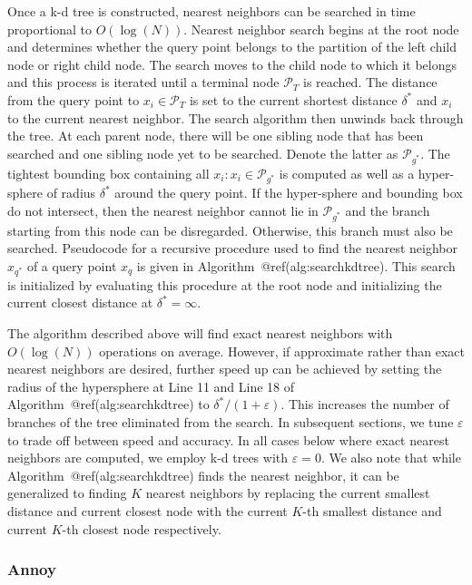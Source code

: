 \documentclass{article}
\begin{document}
Once a k-d tree is constructed, nearest neighbors can be searched in
time proportional to \(O(\log(N))\). Nearest neighbor search begins at
the root node and determines whether the query point belongs to the
partition of the left child node or right child node. The search moves
to the child node to which it belongs and this process is iterated until
a terminal node \(\mathcal{P}_T\) is reached. The distance from the
query point to \(x_i\in\mathcal{P}_T\) is set to the current shortest
distance \(\delta^*\) and \(x_i\) to the current nearest neighbor. The
search algorithm then unwinds back through the tree. At each parent
node, there will be one sibling node that has been searched and one
sibling node yet to be searched. Denote the latter as
\(\mathcal{P}_{g^*}\). The tightest bounding box containing all
\(x_i:x_i\in\mathcal{P}_{g^*}\) is computed as well as a hyper-sphere of
radius \(\delta^*\) around the query point. If the hyper-sphere and
bounding box do not intersect, then the nearest neighbor cannot lie in
\(\mathcal{P}_{g^*}\) and the branch starting from this node can be
disregarded. Otherwise, this branch must also be searched. Pseudocode
for a recursive procedure used to find the nearest neighbor \(x_{q^*}\)
of a query point \(x_q\) is given in Algorithm~@ref(alg:searchkdtree).
This search is initialized by evaluating this procedure at the root node
and initializing the current closest distance at \(\delta^*=\infty\).

The algorithm described above will find exact nearest neighbors with
\(O(\log(N))\) operations on average. However, if approximate rather
than exact nearest neighbors are desired, further speed up can be
achieved by setting the radius of the hypersphere at Line 11 and Line 18
of Algorithm~@ref(alg:searchkdtree) to \(\delta^*/(1+\varepsilon)\).
This increases the number of branches of the tree eliminated from the
search. In subsequent sections, we tune \(\varepsilon\) to trade off
between speed and accuracy. In all cases below where exact nearest
neighbors are computed, we employ k-d trees with \(\varepsilon=0\). We
also note that while Algorithm~@ref(alg:searchkdtree) finds the nearest
neighbor, it can be generalized to finding \(K\) nearest neighbors by
replacing the current smallest distance and current closest node with
the current \(K\)-th smallest distance and current \(K\)-th closest node
respectively.

\hypertarget{annoy}{%
\subsubsection*{Annoy}\label{annoy}}
\end{document}
